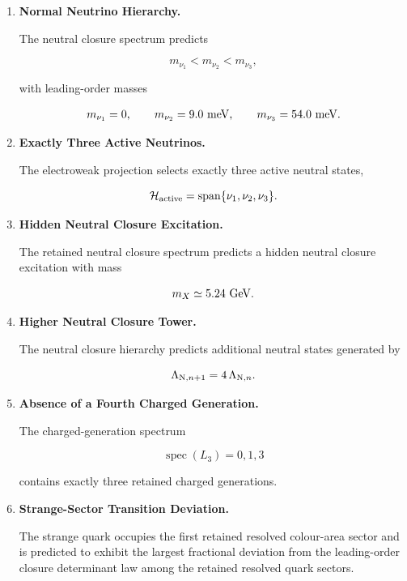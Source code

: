 \documentclass[11pt]{article}
\theoremstyle{definition}
\theoremstyle{remark}
\begin{document}
\begin{enumerate}

\item \textbf{Normal Neutrino Hierarchy.}

The neutral closure spectrum predicts

\begin{equation}
m_{\nu_1}
<
m_{\nu_2}
<
m_{\nu_3},
\end{equation}

with leading-order masses

\begin{equation}
m_{\nu_1}=0,
\qquad
m_{\nu_2}=9.0~{\rm meV},
\qquad
m_{\nu_3}=54.0~{\rm meV}.
\end{equation}

\item \textbf{Exactly Three Active Neutrinos.}

The electroweak projection selects exactly three active neutral
states,

\begin{equation}
\mathcal H_{\rm active}
=
\operatorname{span}
\{\nu_1,\nu_2,\nu_3\}.
\end{equation}

\item \textbf{Hidden Neutral Closure Excitation.}

The retained neutral closure spectrum predicts a hidden neutral
closure excitation with mass

\begin{equation}
m_X
\simeq
5.24~{\rm GeV}.
\end{equation}

\item \textbf{Higher Neutral Closure Tower.}

The neutral closure hierarchy predicts additional neutral
states generated by

\begin{equation}
\Lambda_{{\rm N},n+1}
=
4\,\Lambda_{{\rm N},n}.
\end{equation}

\item \textbf{Absence of a Fourth Charged Generation.}

The charged-generation spectrum

\begin{equation}
\operatorname{spec}(L_3)
=
{0,1,3}
\end{equation}

contains exactly three retained charged generations.

\item \textbf{Strange-Sector Transition Deviation.}

The strange quark occupies the first retained resolved
colour-area sector and is predicted to exhibit the largest
fractional deviation from the leading-order closure determinant
law among the retained resolved quark sectors.

\end{enumerate}
\end{document}
